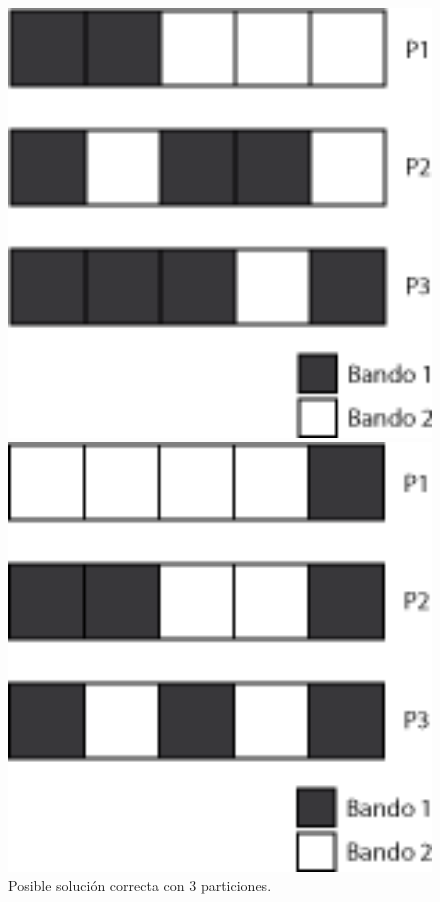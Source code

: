 \begin{figure}[H]
\centering
\begin{minipage}{0.25\textwidth}
  \centering
    \includegraphics[width=1\textwidth]{img/ejemplos/ej1-1.png}
  \caption*{\footnotesize Posible solución correcta con 3 particiones.}
  \label{fig:ej1-1}
\end{minipage}%
\hspace{0.05\textwidth}
\begin{minipage}{0.25\textwidth}   
  \centering
    \includegraphics[width=1\textwidth]{img/ejemplos/ej1-2.png} 

\end{minipage}
\end{figure}
